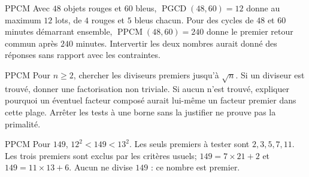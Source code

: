 \documentclass[aspectratio=169,10pt]{beamer}
\begin{document}
\begin{frame}{PPCM}
Avec \(48\) objets rouges et \(60\) bleus, \(\operatorname{PGCD}(48,60)=12\) donne au maximum \(12\) lots, de \(4\) rouges et \(5\) bleus chacun. Pour des cycles de \(48\) et \(60\) minutes démarrant ensemble, \(\operatorname{PPCM}(48,60)=240\) donne le premier retour commun après \(240\) minutes. Intervertir les deux nombres aurait donné des réponses sans rapport avec les contraintes.
\end{frame}
\begin{frame}{PPCM}
Pour \(n\ge2\), chercher les diviseurs premiers jusqu’à \(\sqrt n\). Si un diviseur est trouvé, donner une factorisation non triviale. Si aucun n’est trouvé, expliquer pourquoi un éventuel facteur composé aurait lui-même un facteur premier dans cette plage. Arrêter les tests à une borne sans la justifier ne prouve pas la primalité.
\end{frame}
\begin{frame}{PPCM}
Pour \(149\), \(12^2<149<13^2\). Les seuls premiers à tester sont \(2,3,5,7,11\). Les trois premiers sont exclus par les critères usuels; \(149=7\times21+2\) et \(149=11\times13+6\). Aucun ne divise \(149\) : ce nombre est premier.
\end{frame}
\end{document}
